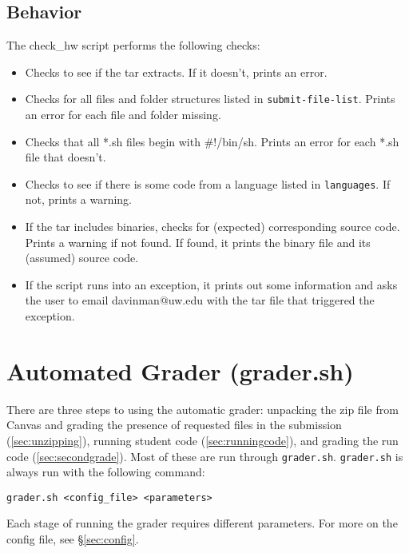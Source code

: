 \documentclass[12pt]{article}
\begin{document}
\subsection{Behavior}

The check\_hw script performs the following checks:

\begin{itemize}
\item Checks to see if the tar extracts. If it doesn't, prints an error.
\item Checks for all files and folder structures listed in \texttt{submit-file-list}. Prints an error for each file and folder missing.
\item Checks that all *.sh files begin with \#!/bin/sh. Prints an error for each *.sh file that doesn't.
\item Checks to see if there is some code from a language listed in \texttt{languages}. If not, prints a warning.
\item If the tar includes binaries, checks for (expected) corresponding source code. Prints a warning if not found. If found, it prints the binary file and its (assumed) source code.
\item If the script runs into an exception, it prints out some information and asks the user to email davinman@uw.edu with the tar file that triggered the exception.
\end{itemize}

\section{Automated Grader (grader.sh)} \label{sec:autograder}

There are three steps to using the automatic grader: unpacking the zip file from Canvas and grading the presence of requested files in the submission (\ref{sec:unzipping}), running student code (\ref{sec:runningcode}), and grading the run code (\ref{sec:secondgrade}). Most of these are run through \texttt{grader.sh}. \texttt{grader.sh} is always run with the following command:

\vspace{5pt}

\texttt{grader.sh <config\_file> <parameters>}

\vspace{5pt}

\noindent Each stage of running the grader requires different parameters. For more on the config file, see \S\ref{sec:config}.
\end{document}
